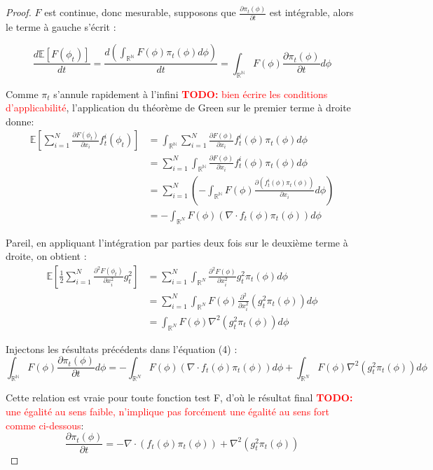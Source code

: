 \documentclass[a4paper,10pt]{article}
\theoremstyle{definition} %
\theoremstyle{definition} %
\theoremstyle{definition} %
\theoremstyle{definition} %
\newcommand{\todo}[1]{\textcolor{red}{\textbf{TODO:} #1}}
\begin{document}
\begin{proof}
$F$ est continue, donc mesurable, supposons que $\frac{\partial\pi_t(\phi)}{\partial t}$ est intégrable, alors le terme à gauche s'écrit :

\[\frac{d\mathbb{E}[F(\phi_t)]}{dt} = \frac{d (\int_{\mathbb{R^N}} F(\phi) \pi_t(\phi) d\phi)} {dt} = \int_{\mathbb{R^N}}F(\phi)\frac{\partial\pi_t(\phi)}{\partial t} d\phi\]

Comme $\pi_t$ s'annule rapidement à l'infini \todo{bien écrire les conditions d'applicabilité}, l’application du théorème de Green sur le premier terme à droite donne:
\begin{align*}
    \mathbb{E}[\sum_{i=1}^N \frac{\partial F(\phi_t)}{\partial x_i} f^i_t(\phi_t)] &= \int_{\mathbb{R^N}}\sum_{i=1}^N \frac{\partial F(\phi)}{\partial x_i} f^i_t(\phi) \pi_t(\phi)d\phi\\
    &=\sum_{i=1}^N \int_{\mathbb{R^N}} \frac{\partial F(\phi)}{\partial x_i} f^i_t(\phi) \pi_t(\phi)d\phi \\
    &= \sum_{i=1}^N(- \int_{\mathbb{R^N}} F(\phi)\frac{\partial (f^i_t(\phi) \pi_t(\phi))}{\partial x_i} d\phi)\\
    &= - \int_{\mathbb{R}^N}F(\phi) (\nabla \cdot f_t(\phi)\pi_t(\phi))d\phi
\end{align*}

Pareil, en appliquant l'intégration par parties deux fois sur le deuxième terme à droite, on obtient :
\begin{align*}
    \mathbb{E}[\frac{1}{2} \sum_{i=1}^N\frac{\partial^2 F(\phi_t)}{\partial x_i^2} g_t^2] &= \sum_{i=1}^N \int_{\mathbb{R}^N } \frac{\partial^2 F(\phi)}{\partial x_i^2} g_t^2 \pi_t(\phi)d\phi\\
    &=\sum_{i=1}^N \int_{\mathbb{R}^N } F(\phi) \frac{\partial^2}{\partial x_i^2} (g_t^2 \pi_t(\phi)) d\phi \\
    &= \int_{\mathbb{R}^N } F(\phi) \nabla^2(g_t^2 \pi_t(\phi)) d\phi
\end{align*}

Injectons les résultats précédents dans l'équation (4) :
\[\int_{\mathbb{R^N}}F(\phi)\frac{\partial\pi_t(\phi)}{\partial t} d\phi = - \int_{\mathbb{R}^N}F(\phi) (\nabla \cdot f_t(\phi)\pi_t(\phi))d\phi + \int_{\mathbb{R}^N } F(\phi) \nabla^2(g_t^2 \pi_t(\phi)) d\phi\]

Cette relation est vraie pour toute fonction test F, d'où le résultat final \todo{une égalité au sens faible, n'implique pas forcément une égalité au sens fort comme ci-dessous}: 
\[\frac{\partial\pi_t(\phi)}{\partial t} = -\nabla \cdot (f_t(\phi)\pi_t(\phi)) + \nabla^2(g_t^2 \pi_t(\phi)) \] 
\end{proof}
\end{document}
